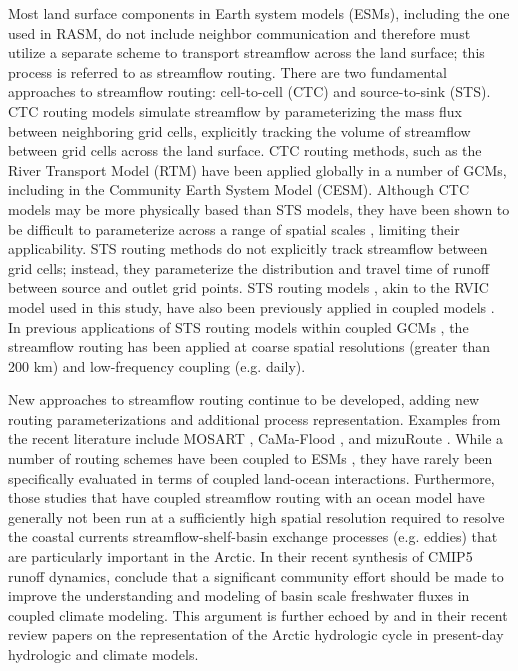\documentclass[jgrga, draft]{agutex}
\begin{document}
\begin{article}
Most land surface components in Earth system models (ESMs), including the one used in RASM, do not include neighbor communication and therefore must utilize a separate scheme to transport streamflow across the land surface; this process is referred to as streamflow routing.
There are two fundamental approaches to streamflow routing: cell-to-cell (CTC) and source-to-sink (STS).
CTC routing models simulate streamflow by parameterizing the mass flux between neighboring grid cells, explicitly tracking the volume of streamflow between grid cells across the land surface.
CTC routing methods, such as the River Transport Model (RTM) \citep{Branstetter_2003} have been applied globally in a number of GCMs, including in the Community Earth System Model (CESM).
Although CTC models may be more physically based than STS models, they have been shown to be difficult to parameterize across a range of spatial scales \citep{Sushama_2004}, limiting their applicability.
STS routing methods do not explicitly track streamflow between grid cells; instead, they parameterize the distribution and travel time of runoff between source and outlet grid points.
STS routing models \citep[e.g.][]{Lohmann_1996,Naden_1992}, akin to the RVIC model used in this study, have also been previously applied in coupled models \citep[e.g.][]{Olivera_2000}.
In previous applications of STS routing models within coupled GCMs \citep[e.g.][]{Olivera_2000}, the streamflow routing has been applied at coarse spatial resolutions (greater than 200 km) and low-frequency coupling (e.g. daily).

New approaches to streamflow routing continue to be developed, adding new routing parameterizations and additional process representation.
Examples from the recent literature include MOSART \citep{Li_2013}, CaMa-Flood \citep{Yamazaki_2009,Yamazaki_2014}, and mizuRoute \citep{Clark_2016}.
While a number of routing schemes have been coupled to ESMs \citep[e.g.][]{Sushama_2004,Olivera_2000,Li_2013}, they have rarely been specifically evaluated in terms of coupled land-ocean interactions.
Furthermore, those studies that have coupled streamflow routing with an ocean model have generally not been run at a sufficiently high spatial resolution required to resolve the coastal currents streamflow-shelf-basin exchange processes (e.g. eddies) that are particularly important in the Arctic.
In their recent synthesis of CMIP5 runoff dynamics, \citet{Bring_2015} conclude that a significant community effort should be made to improve the understanding and modeling of basin scale freshwater fluxes in coupled climate modeling.
This argument is further echoed by \citet{Lique_2015} and \citet{Bring_2016} in their recent review papers on the representation of the Arctic hydrologic cycle in present-day hydrologic and climate models.


\end{article}
\end{document}
